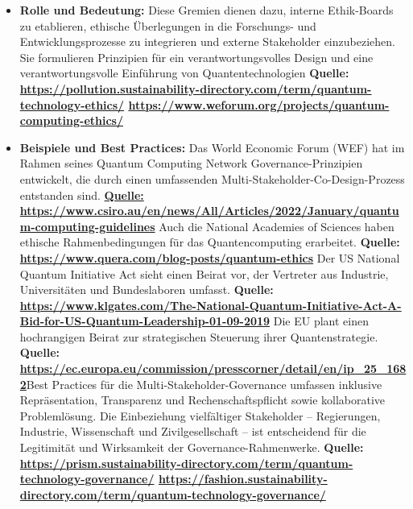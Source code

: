 \begin{itemize}
    \item \textbf{Rolle und Bedeutung:} Diese Gremien dienen dazu, interne Ethik-Boards zu etablieren, ethische Überlegungen in die Forschungs- und Entwicklungsprozesse zu integrieren und externe Stakeholder einzubeziehen. Sie formulieren Prinzipien für ein verantwortungsvolles Design und eine verantwortungsvolle Einführung von Quantentechnologien \textbf{Quelle: \href{https://pollution.sustainability-directory.com/term/quantum-technology-ethics/}{https://pollution.sustainability-directory.com/term/quantum-technology-ethics/} \href{https://www.weforum.org/projects/quantum-computing-ethics/}{https://www.weforum.org/projects/quantum-computing-ethics/}}
\end{itemize}
\begin{itemize}
    \item \textbf{Beispiele und Best Practices:} Das World Economic Forum (WEF) hat im Rahmen seines Quantum Computing Network Governance-Prinzipien entwickelt, die durch einen umfassenden Multi-Stakeholder-Co-Design-Prozess entstanden sind. \textbf{\href{https://www.csiro.au/en/news/All/Articles/2022/January/quantum-computing-guidelines}{Quelle: https://www.csiro.au/en/news/All/Articles/2022/January/quantum-computing-guidelines} }Auch die National Academies of Sciences haben ethische Rahmenbedingungen für das Quantencomputing erarbeitet. \textbf{Quelle: \href{https://www.quera.com/blog-posts/quantum-ethics}{https://www.quera.com/blog-posts/quantum-ethics}} Der US National Quantum Initiative Act sieht einen Beirat vor, der Vertreter aus Industrie, Universitäten und Bundeslaboren umfasst. \textbf{Quelle: \href{https://www.klgates.com/The-National-Quantum-Initiative-Act-A-Bid-for-US-Quantum-Leadership-01-09-2019}{https://www.klgates.com/The-National-Quantum-Initiative-Act-A-Bid-for-US-Quantum-Leadership-01-09-2019}} Die EU plant einen hochrangigen Beirat zur strategischen Steuerung ihrer Quantenstrategie. \textbf{Quelle: \href{https://ec.europa.eu/commission/presscorner/detail/en/ip_25_1682}{https://ec.europa.eu/commission/presscorner/detail/en/ip\_25\_1682}}Best Practices für die Multi-Stakeholder-Governance umfassen inklusive Repräsentation, Transparenz und Rechenschaftspflicht sowie kollaborative Problemlösung. Die Einbeziehung vielfältiger Stakeholder – Regierungen, Industrie, Wissenschaft und Zivilgesellschaft – ist entscheidend für die Legitimität und Wirksamkeit der Governance-Rahmenwerke. \textbf{Quelle: \href{https://prism.sustainability-directory.com/term/quantum-technology-governance/}{https://prism.sustainability-directory.com/term/quantum-technology-governance/} \href{https://fashion.sustainability-directory.com/term/quantum-technology-governance/}{https://fashion.sustainability-directory.com/term/quantum-technology-governance/}}
\end{itemize}
